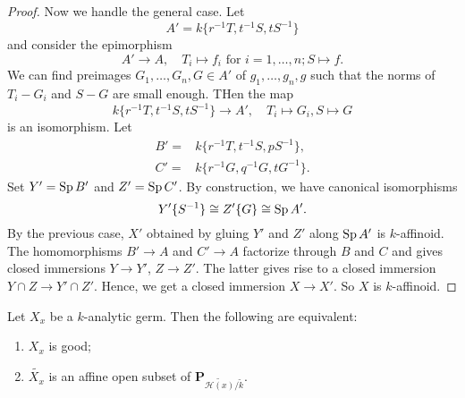 \begin{proof}
    Now we handle the general case. Let
    \[
        A'=  k\{r^{-1}T,t^{-1}S,tS^{-1}\}
    \]
    and consider the epimorphism
    \[
        A'\rightarrow A,\quad T_i\mapsto f_i\text{ for }i=1,\ldots,n; S\mapsto f.  
    \]
    We can find preimages $G_1,\ldots,G_n,G\in A'$ of $g_1,\ldots,g_n,g$ such that the norms of $T_i-G_i$ and $S-G$ are small enough. THen the map
    \[
        k\{r^{-1}T,t^{-1}S,tS^{-1}\}\rightarrow A',\quad T_i\mapsto G_i,S\mapsto G
    \]
    is an isomorphism. Let
    \[
        \begin{aligned}
            B'= & k\{r^{-1}T,t^{-1}S,pS^{-1}\},\\
            C'= & k\{r^{-1}G,q^{-1}G,tG^{-1}\}.
        \end{aligned}  
    \]
    Set $Y'=\operatorname{Sp} B'$ and $Z'=\operatorname{Sp} C'$. By construction, we have canonical isomorphisms
    \[
        Y'\{S^{-1}\}\cong Z'\{G\}\cong \operatorname{Sp} A'.  
    \]
    By the previous case, $X'$ obtained by gluing $Y'$ and $Z'$ along $\operatorname{Sp} A'$ is $k$-affinoid. The homomorphisms $B'\rightarrow A$ and $C'\rightarrow A$ factorize through $B$ and $C$ and gives closed immersions $Y\rightarrow Y'$, $Z\rightarrow Z'$. The latter gives rise to a closed immersion $Y\cap Z\rightarrow Y'\cap Z'$. Hence, we get a closed immersion $X\rightarrow X'$. So $X$ is $k$-affinoid.
\end{proof}


\begin{thm}\label{thm-goodgermandreduction}
    Let $X_x$ be a $k$-analytic germ. Then the following are equivalent:
    \begin{enumerate}
        \item $X_x$ is good;
        \item $\widetilde{X_x}$ is an affine open subset of $\mathbf{P}_{\widetilde{\mathscr{H}(x)}/\tilde{k}}$.
    \end{enumerate}
\end{thm}

